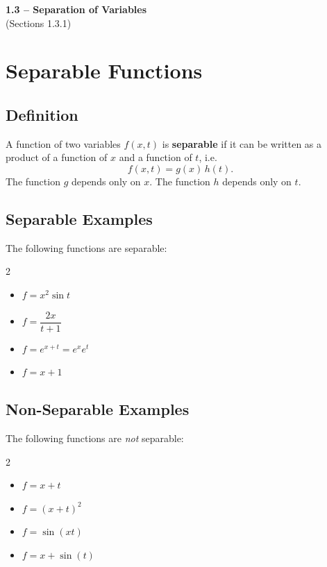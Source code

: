 \documentclass[09pt,letterpaper]{article}
\begin{document}
\begin{center}
\Large\textbf{1.3 – Separation of Variables}\\
\normalsize (Sections 1.3.1)
\end{center}

\section{Separable Functions} 

\subsection{Definition}
A function of two variables $f(x,t)$ is \textbf{separable} if it can be written as a product of a function of $x$ and a function of $t$, i.e.
\[
f(x,t) = g(x)\,h(t).
\]
The function $g$ depends only on $x$. The function $h$ depends only on $t$.

\subsection{Separable Examples}
The following functions are separable:
\begin{multicols}{2}
\begin{itemize}
    \item $f = x^2 \sin t $\\[0.5mm]
    \item $f = \dfrac{2x}{t+1}$
    \item $f = e^{x+t}=e^xe^t$\\[0.5mm]
    \item $f = x+1$ 
\end{itemize}
\end{multicols}
\subsection{Non-Separable Examples}
The following functions are \emph{not} separable:
\begin{multicols}{2}
\begin{itemize}
    \item $f = x + t$\\[0.5mm]
    \item $f = (x+t)^2$
    \item $f = \sin(xt)$\\[0.5mm]
    \item $f = x +\sin(t)$
\end{itemize}
\end{multicols}
\end{document}
